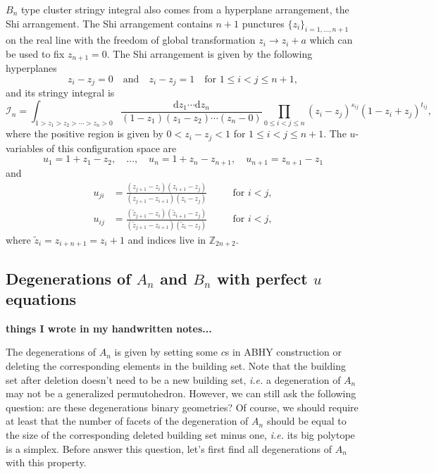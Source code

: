 \documentclass[hidelinks,12pt]{article}
\begin{document}
$B_n$ type cluster stringy integral also comes from a hyperplane arrangement, the Shi arrangement.
The Shi arrangement contains $n+1$ punctures $\{z_i\}_{i=1,\dots,n+1}$ 
on the real line with the freedom of global transformation 
$z_i\to z_i+a$ which can be used to fix $z_{n+1}=0$. The Shi arrangement is 
given by the following hyperplanes
\[
	z_i-z_j=0\quad \text{and}\quad z_i-z_j=1\quad \text{for $1\leq i<j\leq n+1$},
\]
and its stringy integral is 
\[
\mathcal I_n = \int_{1>z_1>z_2>\cdots >z_n>0}
\frac{\mathrm dz_1\cdots \mathrm dz_{n}}{(1-z_1)(z_1-z_2)\cdots (z_{n}-0)}
\prod_{0\leq i<j \leq n}(z_i-z_j)^{s_{ij}}(1-z_i+z_j)^{t_{ij}},
\]
where the positive region is given by $0<z_i-z_j<1$ for $1\leq i<j \leq n+1$.
The $u$-variables of this configuration space are
\[
    u_1=1+z_1-z_2,\quad \dots,\quad u_{n}=1+z_{n}-z_{n+1},\quad u_{n+1}=z_{n+1}-z_1
\]
and 
\[
\begin{aligned}
    u_{ji}&=\frac{(z_{j+1}-z_{i})(z_{i+1}-z_j)}{(z_{j+1}-z_{i+1})(z_i-z_j)}\quad &&\text{for $i<j$},\\
    u_{ij}&=\frac{(\tilde z_{j+1}-z_{i})(\tilde z_{i+1}-z_j)}{(\tilde z_{j+1}-z_{i+1})(\tilde z_i-z_j)}\quad &&\text{for $i<j$},
\end{aligned}
\]
where $\tilde{z}_i=z_{i+n+1}=z_{i}+1$ and indices live in $\mathbb Z_{2n+2}$.

\subsection{Degenerations of $A_n$ and $B_n$ with perfect $u$ equations} 

{\bf things I wrote in my handwritten notes...}

The degenerations of $A_n$ is given by setting some $c$s in ABHY construction or deleting the corresponding elements in the building set. Note that the building set after deletion doesn't need to be a new building set, \emph{i.e.} a degeneration of $A_n$ may not be a generalized permutohedron. However, we can still ask the following question: are these degenerations binary geometries? 
Of course, we should require at least that the number of facets of the degeneration of $A_n$ should be equal to the size of the corresponding deleted building set minus one, \emph{i.e.} its big polytope is a simplex.
Before answer this question, let's first find all degenerations of $A_n$ with this property.
\end{document}
